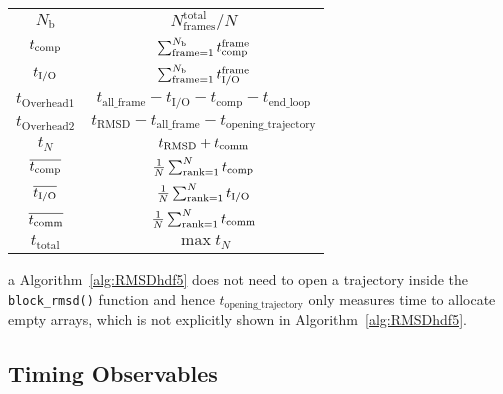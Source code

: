 \begin{table}[!htb]
\begin{threeparttable}
\begin{tabular}{cccc}
    \cmidrule(l){2-4}
    $N_{\text{b}}$ & \multicolumn{3}{c}{$N_{\text{frames}}^{\text{total}}/N$}\\
    ${t}_{\text{comp}}$ & \multicolumn{3}{c}{$\sum_{\text{frame}=1}^{N_{\text{b}}}{t}_{\text{comp}}^{\text{frame}}$}\\
    ${t}_{\text{I/O}}$ & \multicolumn{3}{c}{$\sum_{\text{frame}=1}^{N_{\text{b}}}{t}_{\text{I/O}}^{\text{frame}}$}\\  
    $t_{\text{Overhead1}}$ & \multicolumn{3}{c}{$t_{\text{all\_frame}}-t_{\text{I/O}}-t_{\text{comp}}-t_{\text{end\_loop}}$}  \\
    $t_{\text{Overhead2}}$ & \multicolumn{3}{c}{$t_{\text{RMSD}}-t_{\text{all\_frame}}-t_{\text{opening\_trajectory}}$}  \\
    $t_{N}$ & \multicolumn{3}{c}{$t_{\text{RMSD}}+t_{\text{comm}}$} \\
    \toprule
    $\overline{{t}_{\text{comp}}}$ & \multicolumn{3}{c}{$\frac{1}{N}\sum_{\text{rank}=1}^{N} {t}_{\text{comp}}$} \\
    $\overline{{t}_{\text{I/O}}}$ & \multicolumn{3}{c}{$\frac{1}{N}\sum_{\text{rank}=1}^{N} {t}_{\text{I/O}}$}\\
    $\overline{t_{\text{comm}}}$ & \multicolumn{3}{c}{$\frac{1}{N}\sum_{\text{rank}=1}^{N} t_{\text{comm}}$} \\
    $t_{\text{total}}$ & \multicolumn{3}{c}{$\max t_{N}$} \\
    \bottomrule
  \end{tabular}
    \begin{tablenotes}
    \item [a] Algorithm~\ref{alg:RMSDhdf5} does not need to open a trajectory inside the \texttt{block\_rmsd()} function and hence $t_{\text{opening\_trajectory}}$ only measures time to allocate empty arrays, which is not explicitly shown in Algorithm~\ref{alg:RMSDhdf5}.
      \end{tablenotes}
\end{threeparttable}
\end{table}


\subsection{Timing Observables}

